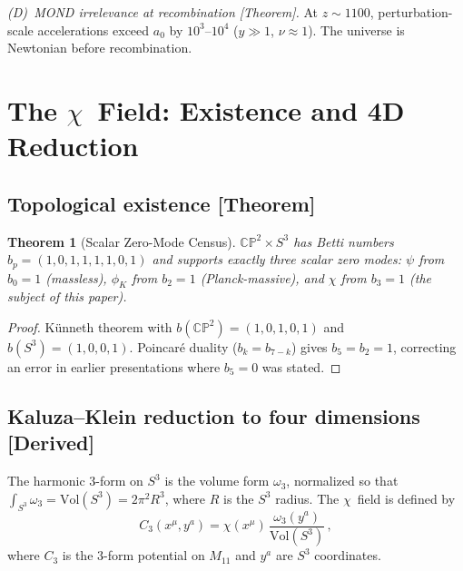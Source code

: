 \documentclass[aps,prd,twocolumn,superscriptaddress,showpacs,floatfix,nofootinbib]{revtex4-2}
\newtheorem{theorem}{Theorem}
\theoremstyle{definition}
\theoremstyle{remark}
\newcommand{\CP}{\mathbb{CP}}
\newcommand{\Sph}{S}
\newcommand{\azero}{a_0}
\newcommand{\grade}[1]{\textsf{\footnotesize [#1]}}
\begin{document}
\emph{(D)~MOND irrelevance at recombination \grade{Theorem}.}
At $z\sim 1100$, perturbation-scale accelerations exceed
$\azero$ by $10^3$--$10^4$ ($y\gg 1$, $\nu\approx 1$).
The universe is Newtonian before recombination.

\section{The $\chi$~Field: Existence and 4D Reduction}
\label{sec:existence}

\subsection{Topological existence \grade{Theorem}}

\begin{theorem}[Scalar Zero-Mode Census]
\label{thm:census}
$\CP^2\times\Sph^3$ has Betti numbers
$b_p = (1,0,1,1,1,1,0,1)$ and supports exactly three
scalar zero modes: $\psi$ from $b_0=1$ (massless),
$\phi_K$ from $b_2=1$ (Planck-massive), and $\chi$
from $b_3=1$ (the subject of this paper).
\end{theorem}

\begin{proof}
K\"unneth theorem with
$b(\CP^2)=(1,0,1,0,1)$ and
$b(\Sph^3)=(1,0,0,1)$. Poincar\'e duality
($b_k=b_{7-k}$) gives $b_5=b_2=1$, correcting
an error in earlier presentations where $b_5=0$
was stated.
\end{proof}

\subsection{Kaluza--Klein reduction to four dimensions
\grade{Derived}}

The harmonic $3$-form on $\Sph^3$ is the volume form
$\omega_3$, normalized so that
$\int_{\Sph^3}\omega_3 = \mathrm{Vol}(\Sph^3) = 2\pi^2 R^3$,
where $R$ is the $\Sph^3$ radius. The $\chi$~field is
defined by
\begin{equation}
\label{eq:chi-def}
C_3(x^\mu, y^a)
= \chi(x^\mu)\,\frac{\omega_3(y^a)}{\mathrm{Vol}(\Sph^3)}\,,
\end{equation}
where $C_3$ is the $3$-form potential on $M_{11}$ and
$y^a$ are $\Sph^3$ coordinates.
\end{document}
